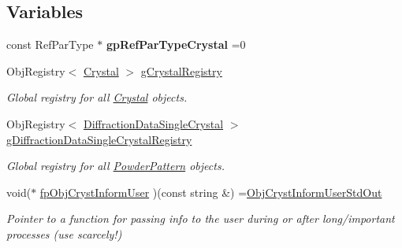 \subsection*{Variables}
\begin{DoxyCompactItemize}
\item 
\mbox{\label{namespace_obj_cryst_a6cbdfcace278e6f7b8ce64f3b2e8ec35}} 
const Ref\+Par\+Type $\ast$ {\bfseries gp\+Ref\+Par\+Type\+Crystal} =0
\item 
\mbox{\label{namespace_obj_cryst_a850db0671ee4526ab68f0a7ec4146a93}} 
Obj\+Registry$<$ \mbox{\hyperlink{class_obj_cryst_1_1_crystal}{Crystal}} $>$ \mbox{\hyperlink{namespace_obj_cryst_a850db0671ee4526ab68f0a7ec4146a93}{g\+Crystal\+Registry}}
\begin{DoxyCompactList}\small\item\em Global registry for all \mbox{\hyperlink{class_obj_cryst_1_1_crystal}{Crystal}} objects. \end{DoxyCompactList}\item 
\mbox{\label{namespace_obj_cryst_a7245404a75c2da190009679af0614f5e}} 
Obj\+Registry$<$ \mbox{\hyperlink{class_obj_cryst_1_1_diffraction_data_single_crystal}{Diffraction\+Data\+Single\+Crystal}} $>$ \mbox{\hyperlink{namespace_obj_cryst_a7245404a75c2da190009679af0614f5e}{g\+Diffraction\+Data\+Single\+Crystal\+Registry}}
\begin{DoxyCompactList}\small\item\em Global registry for all \mbox{\hyperlink{class_obj_cryst_1_1_powder_pattern}{Powder\+Pattern}} objects. \end{DoxyCompactList}\item 
void($\ast$ \mbox{\hyperlink{namespace_obj_cryst_a3af5335bb0e1f8decd5f33c59fe4f1e2}{fp\+Obj\+Cryst\+Inform\+User}} )(const string \&) =\mbox{\hyperlink{namespace_obj_cryst_a9aa5136f02bf658a273ece563304fc03}{Obj\+Cryst\+Inform\+User\+Std\+Out}}
\begin{DoxyCompactList}\small\item\em Pointer to a function for passing info to the user during or after long/important processes (use scarcely!) \end{DoxyCompactList}\item 
\mbox{\label{namespace_obj_cryst_aa5859d344db95026c176b91aef5cbc36}} 

\end{DoxyCompactItemize}
